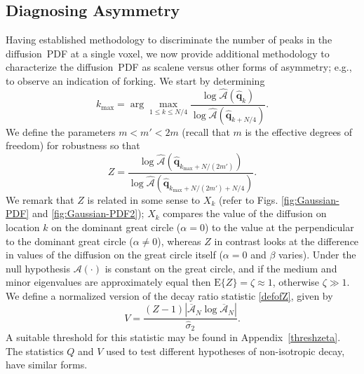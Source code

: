 \documentclass[dvips,aoas,preprint]{imsart}
\numberwithin{equation}{section}
\theoremstyle{plain}
\newcommand{\E}{\ensuremath{\text{E}}}
\newcommand{\q}{\mathbf{q}}
\newcommand{\cA}{\mathcal{A}}
\newcommand{\wh}[1]{\widehat{#1}}
\begin{document}
\subsection{Diagnosing Asymmetry}

Having established methodology to discriminate the number of peaks in
the diffusion~PDF at a single voxel, we now provide additional
methodology to characterize the diffusion~PDF as scalene versus other
forms of asymmetry; e.g., to observe an indication of forking.  We
start by determining
\begin{equation}
  k_\text{max} = \arg\max_{1\le k\le N/4}
  \frac{\log\wh{\cA}(\hat{\q}_k)}{\log\wh{\cA}(\hat{\q}_{k+N/4})}.
\end{equation} 
We define the parameters $m<m'<2m$ (recall that $m$ is the effective degrees
of freedom) for robustness
so that
\begin{equation}
\label{defofZ}
  Z =\frac{\log\wh{\cA}\left(\hat{\q}_{{k}_\text{max}+N/(2m')}\right)}
  {\log\wh\cA\left(\hat{\q}_{{k}_\text{max}+N/(2m')+N/4}\right)}.
\end{equation}
We remark that $Z$ is related in some sense to $X_k$ (refer to Figs.
\ref{fig:Gaussian-PDF} and \ref{fig:Gaussian-PDF2}); $X_k$ compares
the value of the diffusion on location $k$ on the dominant great
circle ($\alpha=0$) to the value at the perpendicular to the dominant
great circle ($\alpha\neq 0$), whereas $Z$ in contrast looks at the
difference in values of the diffusion on the great circle itself
($\alpha=0$ and $\beta$ varies).  Under the null hypothesis
$\cA(\cdot)$ is constant on the great circle, and if the medium and
minor eigenvalues are approximately equal then
$\E\{Z\}=\zeta\approx{1}$, otherwise $\zeta\gg1$.  We define a
normalized version of the decay ratio statistic \eqref{defofZ}, given
by
\begin{equation}
  V = \frac{(Z-1)\left|\overline{\cA}_N\log\overline{\cA}_N\right|}%
  {\hat\sigma_2} .
\end{equation}
A suitable threshold for this statistic may be found in
Appendix~\ref{threshzeta}.  The statistics $Q$ and $V$ used to test
different hypotheses of non-isotropic decay, have similar forms.
\end{document}
